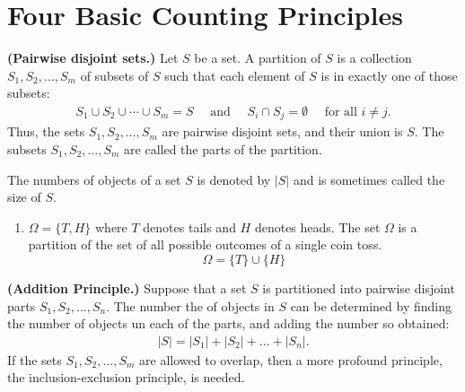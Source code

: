 \section{ Four Basic Counting Principles }
\begin{definition}{\bf (Pairwise disjoint sets.)}
    Let $S$ be a set. A partition of $S$ is a collection $S_1, S_2,\ldots, S_m$ of subsets of $S$ such that each element of $S$
    is in exactly one of those subsets:
    \begin{align*}
        S_1\cup S_2\cup \cdots \cup S_m = S \quad \text{ and } \quad S_i\cap S_j = \emptyset \quad \text{ for all } i\not=j.
    \end{align*}
    Thus, the sets $S_1,S_2,\ldots,S_m$ are pairwise disjoint sets, and their union is $S$. The subsets $S_1,S_2,\ldots,S_m$ are called the parts of the partition.

    The numbers of objects of a set $S$ is denoted by $|S|$ and is sometimes called the size of $S$.
\end{definition}
\begin{example}
    \hspace{0mm}
    \begin{enumerate}
        \item $\Omega = \{ T, H \}$ where $T$ denotes tails and $H$ denotes heads. The set $\Omega$ is a partition of the set of all possible outcomes of a single coin toss.
              $$\Omega = \{T\} \cup \{H\} $$
    \end{enumerate}
\end{example}

\begin{definition}{\bf (Addition Principle.)}
    Suppose that a set $S$ is partitioned into pairwise disjoint parts $S_1, S_2, \ldots , S_n$. The number the 
    of objects in $S$ can be determined by finding the number of objects un each of the parts, and adding the 
    number so obtained:
    \begin{align}
        |S| = |S_1| + |S_2| + \ldots + |S_n|.
    \end{align}
    If the sets $S_1,S_2,\ldots,S_m$ are allowed to overlap, then a more profound principle, the inclusion-exclusion principle, is needed.
\end{definition}

